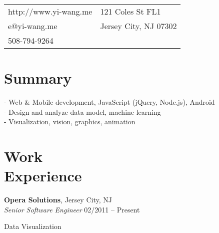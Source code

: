 \documentclass[margin,line]{resume}
\begin{document}
\begin{resume}

      \begin{tabular}{@{}p{6cm}p{8.5cm}}
      http://www.yi-wang.me  &  121 Coles St FL1 \\
      e@yi-wang.me             &  Jersey City, NJ 07302 \\
      508-794-9264	& \\
      \end{tabular}

 
    \section{\mysidestyle Summary}
      
      - Web \& Mobile development, JavaScript (jQuery, Node.js), Android \\
      - Design and analyze data model, machine learning \\
      - Visualization, vision, graphics, animation \\
      
    \section{\mysidestyle Work \\ Experience}

    \textbf{Opera Solutions}, Jersey City, NJ \\
    \textsl{Senior Software Engineer} \hfill 02/2011 -- Present \vspace{-3mm}\\\vspace{-1mm}%
      \begin{list2}
      \item Data Visualization
      \end{list2}


\end{resume}
\end{document}

